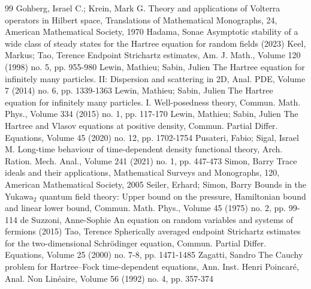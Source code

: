 \documentclass[10pt,a4paper]{amsart}
\begin{document}
\begin{thebibliography}{99}
 Gohberg, Israel C.; Krein, Mark G. Theory and applications of Volterra operators in Hilbert space, Translations of Mathematical Monographs, 24, American Mathematical Society, 1970
 Hadama, Sonae Asymptotic stability of a wide class of steady states for the Hartree equation for random fields (2023)
 Keel, Markus; Tao, Terence Endpoint Strichartz estimates, Am. J. Math., Volume 120 (1998) no. 5, pp. 955-980
 Lewin, Mathieu; Sabin, Julien The Hartree equation for infinitely many particles. II: Dispersion and scattering in 2D, Anal. PDE, Volume 7 (2014) no. 6, pp. 1339-1363
 Lewin, Mathieu; Sabin, Julien The Hartree equation for infinitely many particles. I. Well-posedness theory, Commun. Math. Phys., Volume 334 (2015) no. 1, pp. 117-170
 Lewin, Mathieu; Sabin, Julien The Hartree and Vlasov equations at positive density, Commun. Partial Differ. Equations, Volume 45 (2020) no. 12, pp. 1702-1754
 Pusateri, Fabio; Sigal, Israel M. Long-time behaviour of time-dependent density functional theory, Arch. Ration. Mech. Anal., Volume 241 (2021) no. 1, pp. 447-473
 Simon, Barry Trace ideals and their applications, Mathematical Surveys and Monographs, 120, American Mathematical Society, 2005
 Seiler, Erhard; Simon, Barry Bounds in the Yukawa$_2$ quantum field theory: Upper bound on the pressure, Hamiltonian bound and linear lower bound, Commun. Math. Phys., Volume 45 (1975) no. 2, pp. 99-114
 de Suzzoni, Anne-Sophie An equation on random variables and systems of fermions (2015)
 Tao, Terence Spherically averaged endpoint Strichartz estimates for the two-dimensional Schrödinger equation, Commun. Partial Differ. Equations, Volume 25 (2000) no. 7-8, pp. 1471-1485
 Zagatti, Sandro The Cauchy problem for Hartree–Fock time-dependent equations, Ann. Inst. Henri Poincaré, Anal. Non Linéaire, Volume 56 (1992) no. 4, pp. 357-374
\end{thebibliography}
\end{document}

